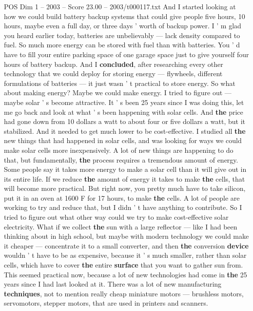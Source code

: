\begin{textsample}{POS Dim 1 – 2003 – Score 23.00 – 2003/t000117.txt}
And I started looking at how we could build battery backup systems that could give people five hours, 10 hours, maybe even a full day, or three days ' worth of backup power.
I ' m glad you heard earlier today, batteries are unbelievably — lack density compared to fuel.
So much more energy can be stored with fuel than with batteries.
You ' d have to fill your entire parking space of one garage space just to give yourself four hours of battery backup.
And I \textbf{concluded}, after researching every other technology that we could deploy for storing energy — flywheels, different formulations of batteries — it just wasn ' t practical to store energy.
So what about making energy?
Maybe we could make energy.
I tried to figure out — maybe solar ' s become attractive.
It ' s been 25 years since I was doing this, let me go back and look at what ' s been happening with solar cells.
And \textbf{the} price had gone down from 10 dollars a watt to about four or five dollars a watt, but it stabilized.
And it needed to get much lower to be cost-effective.
I studied all \textbf{the} new things that had happened in solar cells, and was looking for ways we could make solar cells more inexpensively.
A lot of new things are happening to do that, but fundamentally, \textbf{the} process requires a tremendous amount of energy.
Some people say it takes more energy to make a solar cell than it will give out in its entire life.
If we reduce \textbf{the} amount of energy it takes to make \textbf{the} cells, that will become more practical.
But right now, you pretty much have to take silicon, put it in an oven at 1600 F for 17 hours, to make \textbf{the} cells.
A lot of people are working to try and reduce that, but I didn ' t have anything to contribute.
So I tried to figure out what other way could we try to make cost-effective solar electricity.
What if we collect \textbf{the} sun with a large reflector — like I had been thinking about in high school, but maybe with modern technology we could make it cheaper — concentrate it to a small converter, and then \textbf{the} conversion \textbf{device} wouldn ' t have to be as expensive, because it ' s much smaller, rather than solar cells, which have to cover \textbf{the} entire \textbf{surface} that you want to gather sun from.
This seemed practical now, because a lot of new technologies had come in \textbf{the} 25 years since I had last looked at it.
There was a lot of new manufacturing \textbf{techniques}, not to mention really cheap miniature motors — brushless motors, servomotors, stepper motors, that are used in printers and scanners.

\end{textsample}
